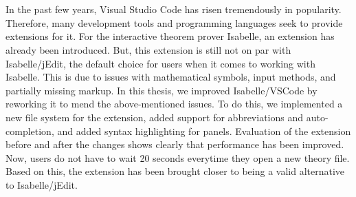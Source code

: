 \chapter{\abstractname}

In the past few years, Visual Studio Code has risen tremendously in popularity. Therefore, many development tools and programming languages seek to provide extensions for it. For the interactive theorem prover Isabelle, an extension has already been introduced. But, this extension is still not on par with Isabelle/jEdit, the default choice for users when it comes to working with Isabelle. This is due to issues with mathematical symbols, input methods, and partially missing markup. In this thesis, we improved Isabelle/VSCode by reworking it to mend the above-mentioned issues. To do this, we implemented a new file system for the extension, added support for abbreviations and auto-completion, and added syntax highlighting for panels. Evaluation of the extension before and after the changes shows clearly that performance has been improved. Now, users do not have to wait 20 seconds everytime they open a new theory file. Based on this, the extension has been brought closer to being a valid alternative to Isabelle/jEdit.




\makeatletter
{}
{\renewcommand{\abstractname}{Kurzfassung}}
{\renewcommand{\abstractname}{Abstract}}
\makeatother





